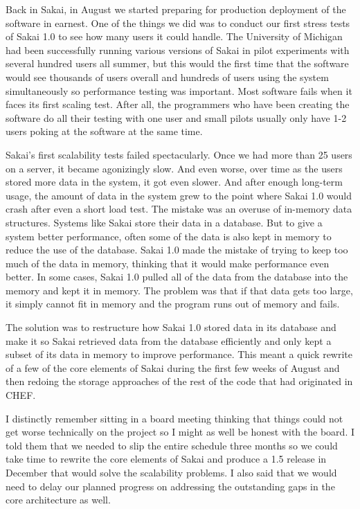 \documentclass[12pt]{book}
\begin{document}
Back in Sakai, in August we started preparing for production deployment
of the software in earnest.  One of the things
we did was to conduct our first stress tests
of Sakai 1.0 to see how many users it could handle.
The University of Michigan had been successfully running various
versions of Sakai in pilot experiments with several
hundred users all summer, but this would
the first time that the software would see
thousands of users overall and hundreds of users
using the system simultaneously so performance testing
was important.
Most software fails when it faces its first scaling
test.  After all, the programmers who have been creating
the software do all their testing with one user
and small pilots usually only have 1-2 users poking
at the software at the same time.

Sakai's first scalability tests failed spectacularly.
Once we had more than 25 users on a server, it became
agonizingly slow.  And even worse, over time
as the users stored more data in the system, it got
even slower.  And after enough long-term usage, the
amount of data in the system grew to the point where
Sakai 1.0 would crash after even a short load test.
The mistake was an overuse of in-memory data
structures.  Systems like Sakai store their data
in a database.  But to give a system better
performance, often some of the data is also kept
in memory to reduce the use of the database.
Sakai 1.0 made the mistake of trying to keep
too much of the data in memory, thinking that
it would make performance even better.
In some cases, Sakai 1.0 pulled all of the
data from the database into the memory
and kept it in memory.  The problem was that if
that data gets too large, it simply cannot fit
in memory and the program runs out of memory
and fails.

The solution was to restructure how Sakai 1.0
stored data in its database and make it so
Sakai retrieved data from the database efficiently
and only kept a subset of its data in memory
to improve performance.  This meant a quick
rewrite of a few of the core elements of Sakai
during the first few weeks of August and then
redoing the storage approaches of the rest of
the code that had originated in CHEF.

I distinctly remember sitting in a board meeting
thinking that things could not get worse
technically on the project so I might as well
be honest with the board.  I told them that
we needed to slip the entire schedule three
months so we could take time to
rewrite the core elements of Sakai and produce
a 1.5 release in December that would solve
the scalability problems.  I also said
that we would need to delay our planned progress
on addressing the outstanding gaps in the
core architecture as well.
\end{document}
